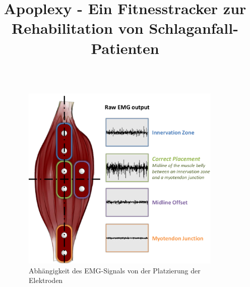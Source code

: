 \documentclass[final,20pt]{beamer}
\title{Apoplexy - Ein Fitnesstracker zur Rehabilitation von Schlaganfall-Patienten}
\newlength{\sepwidth}
\newlength{\colwidth}
\newcommand{\separatorcolumn}{\begin{column}{\sepwidth}\end{column}}
\begin{document}
\begin{frame}[t]

\begin{columns}[t]
\separatorcolumn

\begin{column}{\colwidth}
   \begin{figure}
   	\centering \includegraphics[width=\colwidth]{emg-output.png}
   	\caption{\centering Abhängigkeit des EMG-Signals von der Platzierung der Elektroden}
   \end{figure}
\end{column}

\separatorcolumn
\begin{column}{\colwidth}  
	

\end{column}
\end{columns}
\end{frame}
\end{document}
